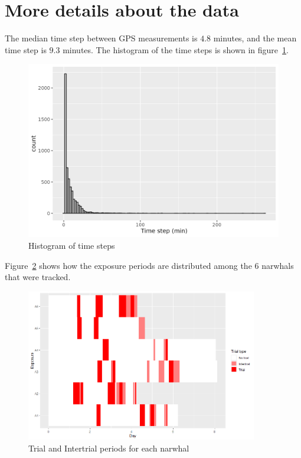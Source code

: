 \documentclass[11pt]{article}
\newcommand {\1}{\mathbb{1}}
\theoremstyle{definition}
\theoremstyle{remark}
\theoremstyle{remark}
\begin{document}
\newpage

\printbibliography

\newpage 

\appendix

\section{More details about the data}

The median time step between GPS measurements is $4.8$ minutes, and the mean time step is $9.3$ minutes. The histogram of the time steps is shown in figure~\ref{fig:alltimestepshisto}.

\begin{figure}[H]
	\centering
	\includegraphics[scale=0.5]{images/data_exploration/all_time_steps_histo}
	\caption{Histogram of time steps}
	\label{fig:alltimestepshisto}
\end{figure}

Figure~\ref{fig: trials and intertrials distributions} shows how the exposure periods are distributed among the $6$ narwhals that were tracked. 

	\begin{figure}[H]
		\centering
			\centering
			\includegraphics[width=0.9\textwidth]{images/data_exploration/trials.png}
			\caption{Trial and Intertrial periods for each narwhal}
			\label{fig: trials and intertrials distributions}
		
	\end{figure}
 
\end{document}
